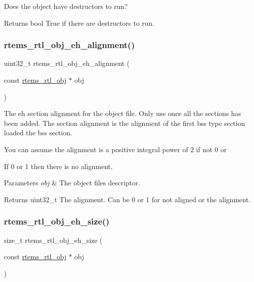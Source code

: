 Does the object have destructors to run?

\begin{DoxyReturn}{Returns}
bool True if there are destructors to run. 
\end{DoxyReturn}
\mbox{\label{rtl-obj_8h_aa093ee073ed78505eab0edc5eefee8b7}} 
\subsubsection{\texorpdfstring{rtems\_rtl\_obj\_eh\_alignment()}{rtems\_rtl\_obj\_eh\_alignment()}}
{\footnotesize\ttfamily uint32\+\_\+t rtems\+\_\+rtl\+\_\+obj\+\_\+eh\+\_\+alignment (\begin{DoxyParamCaption}\item[{const \mbox{\hyperlink{structrtems__rtl__obj}{rtems\+\_\+rtl\+\_\+obj}} $\ast$}]{obj }\end{DoxyParamCaption})}

The eh section alignment for the object file. Only use once all the sections has been added. The section alignment is the alignment of the first bss type section loaded the bss section.

You can assume the alignment is a positive integral power of 2 if not 0 or
\begin{DoxyEnumerate}
\item If 0 or 1 then there is no alignment.
\end{DoxyEnumerate}


\begin{DoxyParams}{Parameters}
{\em obj} & The object file\textquotesingle{}s descriptor. \\
\hline
\end{DoxyParams}
\begin{DoxyReturn}{Returns}
uint32\+\_\+t The alignment. Can be 0 or 1 for not aligned or the alignment. 
\end{DoxyReturn}
\mbox{\label{rtl-obj_8h_a4dbc1988e76114f9d94e56f01b034901}} 
\subsubsection{\texorpdfstring{rtems\_rtl\_obj\_eh\_size()}{rtems\_rtl\_obj\_eh\_size()}}
{\footnotesize\ttfamily size\+\_\+t rtems\+\_\+rtl\+\_\+obj\+\_\+eh\+\_\+size (\begin{DoxyParamCaption}\item[{const \mbox{\hyperlink{structrtems__rtl__obj}{rtems\+\_\+rtl\+\_\+obj}} $\ast$}]{obj }\end{DoxyParamCaption})}

